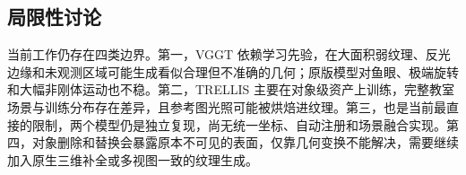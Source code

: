 \subsection{局限性讨论}

当前工作仍存在四类边界。第一，VGGT 依赖学习先验，在大面积弱纹理、反光边缘和未观测区域可能生成看似合理但不准确的几何；原版模型对鱼眼、极端旋转和大幅非刚体运动也不稳。第二，TRELLIS 主要在对象级资产上训练，完整教室场景与训练分布存在差异，且参考图光照可能被烘焙进纹理。第三，也是当前最直接的限制，两个模型仍是独立复现，尚无统一坐标、自动注册和场景融合实现。第四，对象删除和替换会暴露原本不可见的表面，仅靠几何变换不能解决，需要继续加入原生三维补全或多视图一致的纹理生成。
